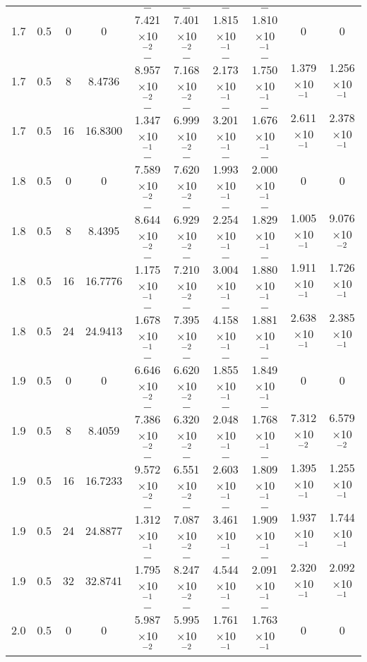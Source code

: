 \documentclass[aps,prd,twocolumn,showpacs,groupedaddress,nofootinbib]{revtex4}
\begin{document}
\begin{widetext}
\begin{table}[h]
\begin{tabular}{|c|c|c|c|c|c|c|c|c|c|}
\hline
1.7&  0.5&  0&  0& $-$7.421$\times$10$^{-2}$& $-$7.401$\times$10$^{-2}$& $-$1.815$\times$10$^{-1}$& $-$1.810$\times$10$^{-1}$&  0&    0\\
  1.7&  0.5&  8&  8.4736& $-$8.957$\times$10$^{-2}$& $-$7.168$\times$10$^{-2}$& $-$2.173$\times$10$^{-1}$& $-$1.750$\times$10$^{-1}$&  1.379$\times$10$^{-1}$&    1.256$\times$10$^{-1}$\\
  1.7&  0.5& 16& 16.8300& $-$1.347$\times$10$^{-1}$& $-$6.999$\times$10$^{-2}$& $-$3.201$\times$10$^{-1}$& $-$1.676$\times$10$^{-1}$&  2.611$\times$10$^{-1}$&    2.378$\times$10$^{-1}$\\
  1.8&  0.5&  0&  0& $-$7.589$\times$10$^{-2}$& $-$7.620$\times$10$^{-2}$& $-$1.993$\times$10$^{-1}$& $-$2.000$\times$10$^{-1}$&  0&    0\\
  1.8&  0.5&  8&  8.4395& $-$8.644$\times$10$^{-2}$& $-$6.929$\times$10$^{-2}$& $-$2.254$\times$10$^{-1}$& $-$1.829$\times$10$^{-1}$&  1.005$\times$10$^{-1}$&    9.076$\times$10$^{-2}$\\
  1.8&  0.5& 16& 16.7776& $-$1.175$\times$10$^{-1}$& $-$7.210$\times$10$^{-2}$& $-$3.004$\times$10$^{-1}$& $-$1.880$\times$10$^{-1}$&  1.911$\times$10$^{-1}$&    1.726$\times$10$^{-1}$\\
  1.8&  0.5& 24& 24.9413& $-$1.678$\times$10$^{-1}$& $-$7.395$\times$10$^{-2}$& $-$4.158$\times$10$^{-1}$& $-$1.881$\times$10$^{-1}$&  2.638$\times$10$^{-1}$&    2.385$\times$10$^{-1}$\\
  1.9&  0.5&  0&  0& $-$6.646$\times$10$^{-2}$& $-$6.620$\times$10$^{-2}$& $-$1.855$\times$10$^{-1}$& $-$1.849$\times$10$^{-1}$&  0&    0\\
  1.9&  0.5&  8&  8.4059& $-$7.386$\times$10$^{-2}$& $-$6.320$\times$10$^{-2}$& $-$2.048$\times$10$^{-1}$& $-$1.768$\times$10$^{-1}$&  7.312$\times$10$^{-2}$&    6.579$\times$10$^{-2}$\\
  1.9&  0.5& 16& 16.7233& $-$9.572$\times$10$^{-2}$& $-$6.551$\times$10$^{-2}$& $-$2.603$\times$10$^{-1}$& $-$1.809$\times$10$^{-1}$&  1.395$\times$10$^{-1}$&    1.255$\times$10$^{-1}$\\
  1.9&  0.5& 24& 24.8877& $-$1.312$\times$10$^{-1}$& $-$7.087$\times$10$^{-2}$& $-$3.461$\times$10$^{-1}$& $-$1.909$\times$10$^{-1}$&  1.937$\times$10$^{-1}$&    1.744$\times$10$^{-1}$\\
  1.9&  0.5& 32& 32.8741& $-$1.795$\times$10$^{-1}$& $-$8.247$\times$10$^{-2}$& $-$4.544$\times$10$^{-1}$& $-$2.091$\times$10$^{-1}$&  2.320$\times$10$^{-1}$&    2.092$\times$10$^{-1}$\\
  2.0&  0.5&  0&  0& $-$5.987$\times$10$^{-2}$& $-$5.995$\times$10$^{-2}$& $-$1.761$\times$10$^{-1}$& $-$1.763$\times$10$^{-1}$&  0&    0\\

\end{tabular}
\end{table}
\end{widetext}
\end{document}
